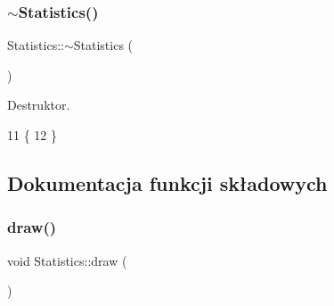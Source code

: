 \subsubsection{\texorpdfstring{$\sim$\+Statistics()}{~Statistics()}}
{\footnotesize\ttfamily Statistics\+::$\sim$\+Statistics (\begin{DoxyParamCaption}{ }\end{DoxyParamCaption})}

Destruktor. 
\begin{DoxyCode}
11 \{
12 \}
\end{DoxyCode}


\subsection{Dokumentacja funkcji składowych}
\mbox{\label{class_statistics_a5345e618eb4d5b8448a86d519d5ee33d}} 
\subsubsection{\texorpdfstring{draw()}{draw()}}
{\footnotesize\ttfamily void Statistics\+::draw (\begin{DoxyParamCaption}{ }\end{DoxyParamCaption})}


